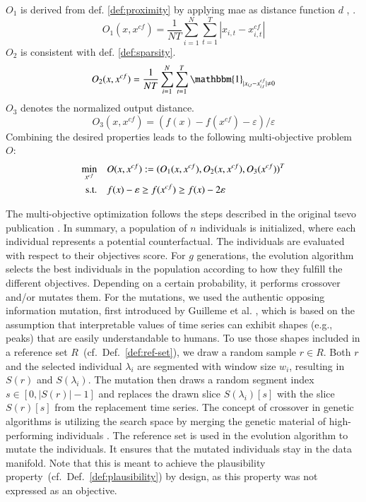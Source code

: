 \begin{definition}
$O_{1}$ is derived from def. \ref{def:proximity} by applying \gls{mae} as distance function $d$ \cite{mothilal_explaining_2020}, \cite{wachter_counterfactual_2018}.
$$O_{1}(x, x^{c f})=\frac{1}{NT} \sum_{i=1}^{N} \sum_{t=1}^{T}|x_{i, t}-x_{i, t}^{c f}|$$ $O_{2}$ is consistent with def. \ref{def:sparsity}.
$$O_{2}(x, x^{c f})=\frac{1}{NT} \sum_{i=1}^{N} \sum_{t=1}^{T} \mathbbm{1}_{|x_{i, t}-x_{i, t}^{c f}| \neq 0}$$ $O_{3}$ denotes the normalized output distance.
$$O_{3}(x, x^{c f})=(f(x) - f(x^{c f})-\varepsilon) / \varepsilon$$ Combining the desired properties leads to the following multi-objective problem $O$:
\begin{equation}
\begin{aligned}
\min_{x^{cf}} \quad & O(x, x^{cf}):=(O_{1}(x, x^{c f}), O_{2}(x, x^{c f}), O_{3}(x^{c f}))^T\\
\mathrm{s.t.} \quad & f(x) - \varepsilon \geq f(x^{c f}) \geq f(x) - 2\varepsilon\\
\end{aligned}
\end{equation}
\end{definition}
The multi-objective optimization follows the steps described in the original \gls{tsevo} publication \cite{hollig_tsevo_2022}.
In summary, a population of $n$ individuals is initialized, where each individual represents a potential counterfactual.
The individuals are evaluated with respect to their objectives score.
For $g$ generations, the evolution algorithm selects the best individuals in the population according to how they fulfill the different objectives. Depending on a certain probability, it performs crossover and/or mutates them. For the mutations, we used the authentic opposing information mutation, first introduced by Guilleme et al. \cite{guilleme_agnostic_2019}, which is based on the assumption that interpretable values of time series can exhibit shapes (e.g., peaks) that are easily understandable to humans.
To use those shapes included in a reference set $R$~(cf.~Def.~\ref{def:ref-set}), we draw a random sample $r \in R$. 
Both $r$ and the selected individual $\lambda_i$ are segmented with window size $w_i$, resulting in $S(r)$ and $S(\lambda_i)$. The mutation then draws a random segment index $s \in [ 0,|S(r)|-1]$ and replaces the drawn slice $S(\lambda_i)[s]$ with the slice $S(r)[s]$ from the replacement time series. The concept of crossover in genetic algorithms is utilizing the search space by merging the genetic material of high-performing individuals \cite{mitchell_introduction_1998}.
The reference set is used in the evolution algorithm to mutate the individuals. It ensures that the mutated individuals stay in the data manifold. Note that this is meant to achieve the plausibility property~(cf.~Def.~\ref{def:plausibility}) by design, as this property was not expressed as an objective.

